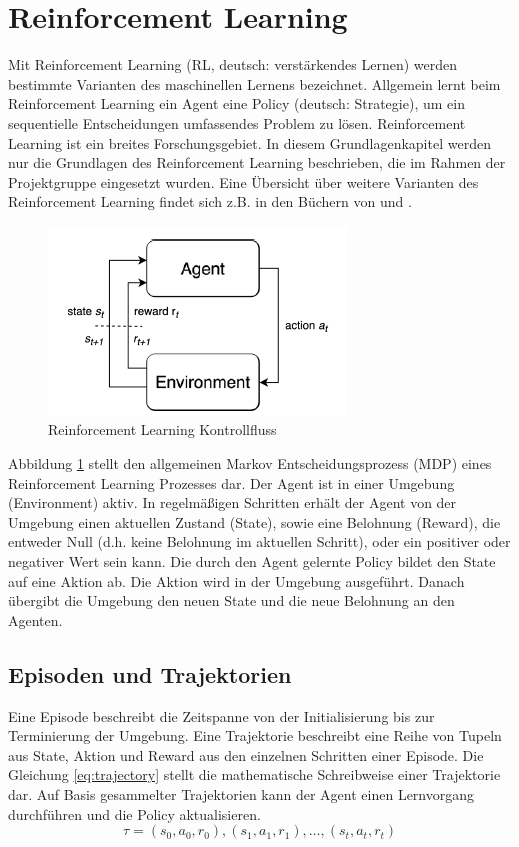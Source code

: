 \section{Reinforcement Learning}
Mit Reinforcement Learning (RL, deutsch: verstärkendes Lernen) werden bestimmte Varianten des maschinellen Lernens bezeichnet. Allgemein lernt beim Reinforcement Learning ein Agent eine Policy (deutsch: Strategie), um ein sequentielle Entscheidungen umfassendes Problem zu lösen. Reinforcement Learning ist ein breites Forschungsgebiet. In diesem Grundlagenkapitel werden nur die Grundlagen des Reinforcement Learning beschrieben, die im Rahmen der Projektgruppe eingesetzt wurden. Eine Übersicht über weitere Varianten des Reinforcement Learning findet sich z.B. in den Büchern von \citeauthor{FoundationsDeepRL} und \citeauthor{deepRL-2020}.\newline
\begin{figure}
    \centering
    \includegraphics{resources/img/Reinforcement_Learning/RL Control Loop.png}
    \caption{Reinforcement Learning Kontrollfluss \cite{FoundationsDeepRL}}
    \label{fig:rl_control_loop}
\end{figure}
\noindent Abbildung \ref{fig:rl_control_loop} stellt den allgemeinen Markov Entscheidungsprozess (MDP) eines Reinforcement Learning Prozesses dar. Der Agent ist in einer Umgebung (Environment) aktiv. In regelmäßigen Schritten erhält der Agent von der Umgebung einen aktuellen Zustand (State), sowie eine Belohnung (Reward), die entweder Null (d.h. keine Belohnung im aktuellen Schritt), oder ein positiver oder negativer Wert sein kann. Die durch den Agent gelernte Policy bildet den State auf eine Aktion ab. Die Aktion wird in der Umgebung ausgeführt. Danach übergibt die Umgebung den neuen State und die neue Belohnung an den Agenten.\cite{FoundationsDeepRL}

\subsection{Episoden und Trajektorien}
Eine Episode beschreibt die Zeitspanne von der Initialisierung bis zur Terminierung der Umgebung. Eine Trajektorie beschreibt eine Reihe von Tupeln aus State, Aktion und Reward aus den einzelnen Schritten einer Episode. Die Gleichung \ref{eq:trajectory} stellt die mathematische Schreibweise einer Trajektorie dar. Auf Basis gesammelter Trajektorien kann der Agent einen Lernvorgang durchführen und die Policy aktualisieren.\cite{FoundationsDeepRL}
\begin{equation}
    \tau = (s_0,a_0,r_0), (s_1,a_1,r_1), \dots, (s_t,a_t,r_t)
    \label{eq:trajectory}
\end{equation}

